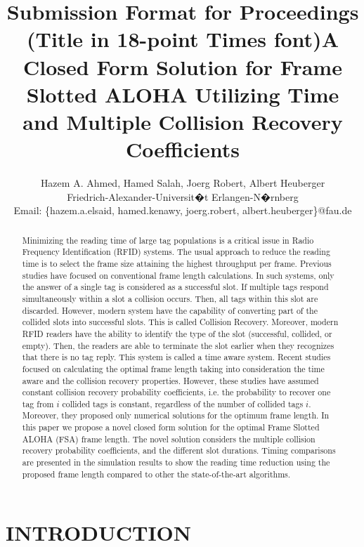 \documentclass[10pt,conference,letterpaper]{RWWTemplate}
\title{Submission Format for Proceedings (Title in 18-point Times font)}
\author{Hazem A. Ahmed, Hamed Salah, Joerg Robert, Albert Heuberger\\
Friedrich-Alexander-Universit�t Erlangen-N�rnberg\\
 Email: \{hazem.a.elsaid, hamed.kenawy, joerg.robert, albert.heuberger\}@fau.de}
\begin{document}
\title{A Closed Form Solution for Frame Slotted ALOHA Utilizing Time and
Multiple Collision Recovery Coefficients}



\maketitle
\begin{abstract}
Minimizing the reading time of large tag populations is a critical
issue in Radio Frequency Identification (RFID) systems. The usual
approach to reduce the reading time is to select the frame size attaining
the highest throughput per frame. Previous studies have focused on
conventional frame length calculations. In such systems, only the
answer of a single tag is considered as a successful slot. If multiple
tags respond simultaneously within a slot a collision occurs. Then,
all tags within this slot are discarded. However, modern system have
the capability of converting part of the collided slots into successful
slots. This is called Collision Recovery. Moreover, modern RFID readers
have the ability to identify the type of the slot (successful, collided,
or empty). Then, the readers are able to terminate the slot earlier
when they recognizes that there is no tag reply. This system is called
a time aware system. Recent studies focused on calculating the optimal
frame length taking into consideration the time aware and the collision
recovery properties. However, these studies have assumed constant
collision recovery probability coefficients, i.e. the probability
to recover one tag from $i$ collided tags is constant, regardless
of the number of collided tags $i$. Moreover, they proposed only
numerical solutions for the optimum frame length. In this paper we
propose a novel closed form solution for the optimal Frame Slotted
ALOHA (FSA) frame length. The novel solution considers the multiple
collision recovery probability coefficients, and the different slot
durations. Timing comparisons are presented in the simulation results
to show the reading time reduction using the proposed frame length
compared to other the state-of-the-art algorithms.

\end{abstract}


\section{INTRODUCTION}
\end{document}
